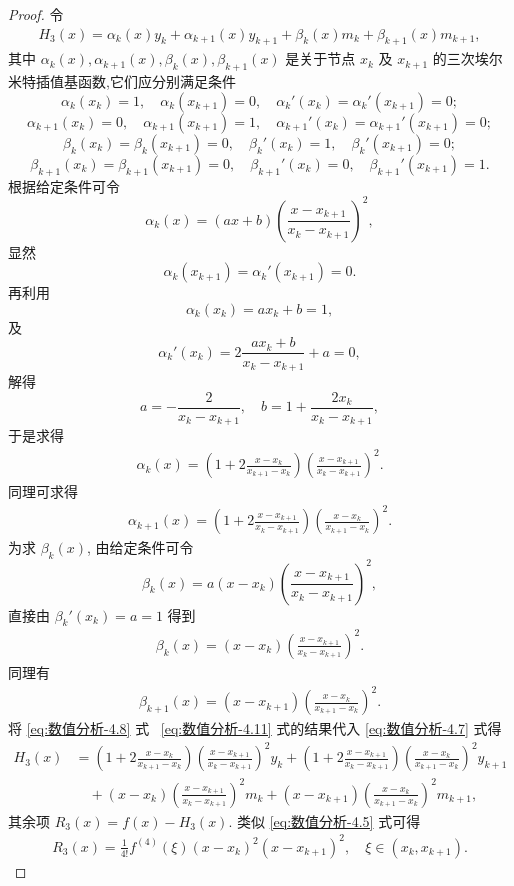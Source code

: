 \documentclass[../../main.tex]{subfiles}
\begin{document}
\begin{proof}
令
\begin{align}
H_3(x) = \alpha_k(x)y_k + \alpha_{k+1}(x)y_{k+1} + \beta_k(x)m_k + \beta_{k+1}(x)m_{k+1}, \label{eq:数值分析-4.7}
\end{align}
其中 $\alpha_k(x), \alpha_{k+1}(x), \beta_k(x), \beta_{k+1}(x)$ 是关于节点 $x_k$ 及 $x_{k+1}$ 的三次埃尔米特插值基函数,它们应分别满足条件
\[
\alpha_k(x_k) = 1, \quad \alpha_k(x_{k+1}) = 0, \quad \alpha_k'(x_k) = \alpha_k'(x_{k+1}) = 0;
\]
\[
\alpha_{k+1}(x_k) = 0, \quad \alpha_{k+1}(x_{k+1}) = 1, \quad \alpha_{k+1}'(x_k) = \alpha_{k+1}'(x_{k+1}) = 0;
\]
\[
\beta_k(x_k) = \beta_k(x_{k+1}) = 0, \quad \beta_k'(x_k) = 1, \quad \beta_k'(x_{k+1}) = 0;
\]
\[
\beta_{k+1}(x_k) = \beta_{k+1}(x_{k+1}) = 0, \quad \beta_{k+1}'(x_k) = 0, \quad \beta_{k+1}'(x_{k+1}) = 1.
\]
根据给定条件可令
\[
\alpha_k(x) = (ax + b) \left( \frac{x - x_{k+1}}{x_k - x_{k+1}} \right)^2,
\]
显然
\[
\alpha_k(x_{k+1}) = \alpha_k'(x_{k+1}) = 0.
\]
再利用
\[
\alpha_k(x_k) = ax_k + b = 1,
\]
及
\[
\alpha_k'(x_k) = 2 \frac{ax_k + b}{x_k - x_{k+1}} + a = 0,
\]
解得
\[
a = -\frac{2}{x_k - x_{k+1}}, \quad b = 1 + \frac{2x_k}{x_k - x_{k+1}},
\]
于是求得
\begin{align}
\alpha_k(x) = \left( 1 + 2 \frac{x - x_k}{x_{k+1} - x_k} \right) \left( \frac{x - x_{k+1}}{x_k - x_{k+1}} \right)^2. \label{eq:数值分析-4.8}
\end{align}
同理可求得
\begin{align}
\alpha_{k+1}(x) = \left( 1 + 2 \frac{x - x_{k+1}}{x_k - x_{k+1}} \right) \left( \frac{x - x_k}{x_{k+1} - x_k} \right)^2. \label{eq:数值分析-4.9}
\end{align}
为求 $\beta_k(x)$, 由给定条件可令
\[
\beta_k(x) = a(x - x_k) \left( \frac{x - x_{k+1}}{x_k - x_{k+1}} \right)^2,
\]
直接由 $\beta_k'(x_k) = a = 1$ 得到
\begin{align}
\beta_k(x) = (x - x_k) \left( \frac{x - x_{k+1}}{x_k - x_{k+1}} \right)^2. \label{eq:数值分析-4.10}
\end{align}
同理有
\begin{align}
\beta_{k+1}(x) = (x - x_{k+1}) \left( \frac{x - x_k}{x_{k+1} - x_k} \right)^2. \label{eq:数值分析-4.11}
\end{align}
将 \eqref{eq:数值分析-4.8} 式~ \eqref{eq:数值分析-4.11} 式的结果代入 \eqref{eq:数值分析-4.7} 式得
\begin{align*}
H_3(x) &= \left( 1 + 2 \frac{x - x_k}{x_{k+1} - x_k} \right) \left( \frac{x - x_{k+1}}{x_k - x_{k+1}} \right)^2 y_k + \left( 1 + 2 \frac{x - x_{k+1}}{x_k - x_{k+1}} \right) \left( \frac{x - x_k}{x_{k+1} - x_k} \right)^2 y_{k+1} \\
&\quad + (x - x_k) \left( \frac{x - x_{k+1}}{x_k - x_{k+1}} \right)^2 m_k + (x - x_{k+1}) \left( \frac{x - x_k}{x_{k+1} - x_k} \right)^2 m_{k+1}, 
\end{align*}
其余项 $R_3(x) = f(x) - H_3(x)$. 类似 \eqref{eq:数值分析-4.5} 式可得
\begin{align*}
R_3(x) = \frac{1}{4!} f^{(4)}(\xi) (x - x_k)^2 (x - x_{k+1})^2, \quad \xi \in (x_k, x_{k+1}). 
\end{align*}

\end{proof}
\end{document}
